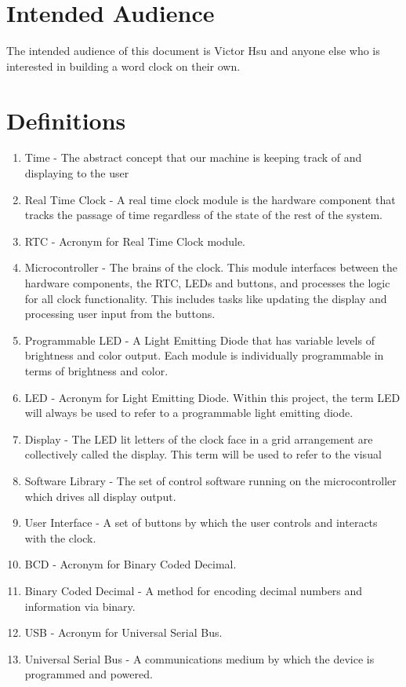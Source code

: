 \documentclass[10pt,draftclsnofoot,onecolumn]{IEEEtran}
\begin{document}
\section{Intended Audience}
The intended audience of this document is Victor Hsu and anyone else who is interested in building a word clock on their own. 

\newpage

\section{Definitions}
\begin{enumerate}[]
  \item Time - The abstract concept that our machine is keeping track of and displaying to the user
  \item Real Time Clock - A real time clock module is the hardware component that tracks the passage
  of time regardless of the state of the rest of the system.
  \item RTC - Acronym for Real Time Clock module.
  \item Microcontroller - The brains of the clock. This module interfaces between the hardware
  components, the RTC, LEDs and buttons, and processes the logic for all clock functionality.
  This includes tasks like updating the display and processing user input from the buttons.
  \item Programmable LED - A Light Emitting Diode that has variable levels of brightness and
  color output. Each module is individually programmable in terms of brightness and color.
  \item LED - Acronym for Light Emitting Diode. Within this project, the term LED will always
  be used to refer to a programmable light emitting diode.
  \item Display - The LED lit letters of the clock face in a grid arrangement are collectively
  called the display. This term will be used to refer to the visual
  \item Software Library - The set of control software running on the microcontroller which drives all display output.
  \item User Interface - A set of buttons by which the user controls and interacts with the clock.
  \item BCD - Acronym for Binary Coded Decimal.
  \item Binary Coded Decimal - A method for encoding decimal numbers and information via binary.
  \item USB - Acronym for Universal Serial Bus.
  \item Universal Serial Bus - A communications medium by which the device is programmed and  powered.
\end{enumerate}
\end{document}
